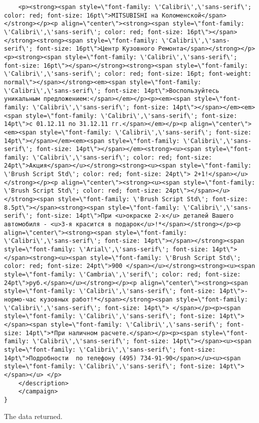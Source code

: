 \documentclass[a4paper,9pt]{extarticle}
\begin{document}
\begin{lstlisting}
	<p><strong><span style=\"font-family: \'Calibri\',\'sans-serif\'; color: red; font-size: 16pt\">MITSUBISHI на Коломенской</span></strong></p><p align=\"center\"><strong><span style=\"font-family: \'Calibri\',\'sans-serif\'; color: red; font-size: 16pt\"></span></strong><strong><span style=\"font-family: \'Calibri\',\'sans-serif\'; font-size: 16pt\">Центр Кузовного Ремонта</span></strong></p><p><strong><span style=\"font-family: \'Calibri\',\'sans-serif\'; font-size: 16pt\"></span></strong><strong><span style=\"font-family: \'Calibri\',\'sans-serif\'; color: red; font-size: 16pt; font-weight: normal\"></span></strong><em><span style=\"font-family: \'Calibri\',\'sans-serif\'; font-size: 14pt\">Воспользуйтесь уникальным предложением:</span></em></p><p><em><span style=\"font-family: \'Calibri\',\'sans-serif\'; font-size: 14pt\"></span></em><em><span style=\"font-family: \'Calibri\',\'sans-serif\'; font-size: 14pt\">с 01.12.11 по 31.12.11 гг.</span></em></p><p align=\"center\"><em><span style=\"font-family: \'Calibri\',\'sans-serif\'; font-size: 14pt\"></span></em><em><span style=\"font-family: \'Calibri\',\'sans-serif\'; font-size: 14pt\"></span></em><strong><u><span style=\"font-family: \'Calibri\',\'sans-serif\'; color: red; font-size: 24pt\">Акция</span></u></strong><strong><u><span style=\"font-family: \'Brush Script Std\'; color: red; font-size: 24pt\"> 2+1!</span></u></strong></p><p align=\"center\"><strong><u><span style=\"font-family: \'Brush Script Std\'; color: red; font-size: 24pt\"></span></u></strong><span style=\"font-family: \'Brush Script Std\'; font-size: 8.5pt\"></span><strong><span style=\"font-family: \'Calibri\',\'sans-serif\'; font-size: 14pt\">При <u>окраске 2-х</u> деталей Вашего автомобиля - <u>3-я красится в подарок</u>!*</span></strong></p><p align=\"center\"><strong><span style=\"font-family: \'Calibri\',\'sans-serif\'; font-size: 14pt\"></span></strong><span style=\"font-family: \'Arial\',\'sans-serif\'; font-size: 14pt\"></span><strong><u><span style=\"font-family: \'Brush Script Std\'; color: red; font-size: 24pt\">900 </span></u></strong><strong><u><span style=\"font-family: \'Cambria\',\'serif\'; color: red; font-size: 24pt\">руб.</span></u></strong></p><p align=\"center\"><strong><span style=\"font-family: \'Calibri\',\'sans-serif\'; font-size: 14pt\">- нормо-час кузовных работ!*</span></strong><span style=\"font-family: \'Calibri\',\'sans-serif\'; font-size: 14pt\"> </span></p><p><span style=\"font-family: \'Calibri\',\'sans-serif\'; font-size: 14pt\"></span><span style=\"font-family: \'Calibri\',\'sans-serif\'; font-size: 14pt\">*При наличном расчете.</span></p><p><span style=\"font-family: \'Calibri\',\'sans-serif\'; font-size: 14pt\"></span><u><span style=\"font-family: \'Calibri\',\'sans-serif\'; font-size: 14pt\">Подробности  по телефону (495) 734-91-90</span></u><u><span style=\"font-family: \'Calibri\',\'sans-serif\'; font-size: 14pt\"></span></u> </p>
	</description>
	</campaign>
}
		\end{lstlisting}
	The data returned.
		\newpage
		
		
	

		
\end{document}
